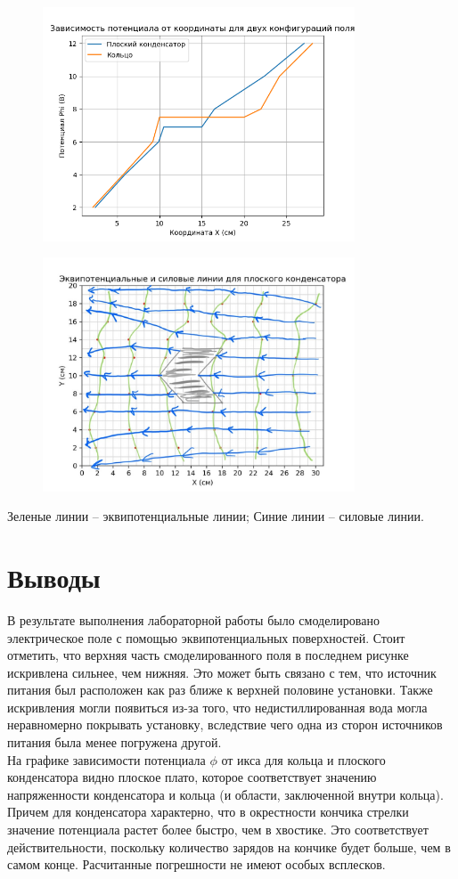 \documentclass{article}%
\begin{document}
\begin{figure}[h!]%
\centering%
\includegraphics[width=350px]{2_potentials.png}%
\newpage%
\end{figure}

%


\begin{figure}[h!]%
\centering%
\includegraphics[width=350px]{potential_field.jpg}%
\end{figure}

%
Зеленые линии – эквипотенциальные линии; Синие линии – силовые линии.%
\newline%
\section{Выводы}%
\label{sec:}%

%
В результате выполнения лабораторной работы было смоделировано электрическое поле с помощью эквипотенциальных поверхностей. Стоит отметить, что верхняя часть смоделированного поля в последнем рисунке искривлена сильнее, чем нижняя. Это может быть связано с тем, что источник питания был расположен как раз ближе к верхней половине установки. Также искривления могли появиться из-за того, что недистиллированная вода могла неравномерно покрывать установку, вследствие чего одна из сторон источников питания была менее погружена другой. \\ На графике зависимости потенциала $\phi$ от икса для кольца и плоского конденсатора видно плоское плато, которое соответствует значению напряженности конденсатора и кольца (и области, заключенной внутри кольца). Причем для конденсатора характерно, что в окрестности кончика стрелки значение потенциала растет более быстро, чем в хвостике. Это соответствует действительности, поскольку количество зарядов на кончике будет больше, чем в самом конце. Расчитанные погрешности не имеют особых всплесков.%
\newline%
\end{document}

